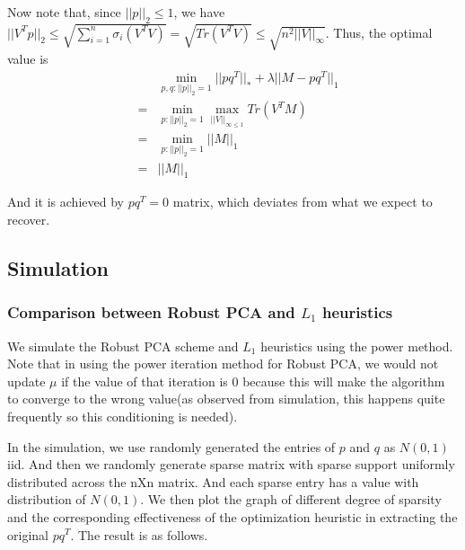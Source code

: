 Now note that, since $||p||_{2}\le1$, we have $||V^{T}p||_{2}\le\sqrt{\sum_{i=1}^{n}\sigma_{i}(V^{T}V)}=\sqrt{Tr(V^{T}V)}\le\sqrt{n^{2}||V||_{\infty}}$.
Thus, the optimal value is
\begin{eqnarray*}
 &  & \min_{p,q:||p||_{2}=1}||pq^{T}||_{*}+\lambda||M-pq^{T}||_{1}\\
 & = & \min_{p:||p||_{2}=1}\max_{||V||_{\infty\le1}}Tr(V^{T}M)\\
 & = & \min_{p:||p||_{2}=1}||M||_{1}\\
 & = & ||M||_{1}
\end{eqnarray*}


And it is achieved by $pq^{T}=0$ matrix, which deviates from what
we expect to recover.


\subsection{Simulation }


\subsubsection{Comparison between Robust PCA and $L_{1}$ heuristics}

We simulate the Robust PCA scheme and $L_{1}$ heuristics using the
power method. Note that in using the power iteration method for Robust
PCA, we would not update $\mu$ if the value of that iteration is
0 because this will make the algorithm to converge to the wrong value(as
observed from simulation, this happens quite frequently so this conditioning
is needed).

In the simulation, we use randomly generated the entries of $p$ and
$q$ as $N(0,1)$ iid. And then we randomly generate sparse matrix
with sparse support uniformly distributed across the nXn matrix. And
each sparse entry has a value with distribution of $N(0,1)$. We then
plot the graph of different degree of sparsity and the corresponding
effectiveness of the optimization heuristic in extracting the original
$pq^{T}$. The result is as follows.


